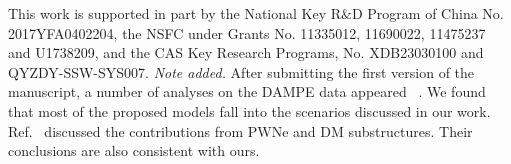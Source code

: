 \documentclass[aps,prl,twocolumn,a4paper]{revtex4}
\begin{document}



\begin{acknowledgments}
This work is supported in part by the National Key R$\&$D Program of China 
No. 2017YFA0402204, the NSFC under Grants No. 11335012, 11690022, 11475237 and U1738209,
and the CAS Key Research Programs, No. XDB23030100 and QYZDY-SSW-SYS007.
{\it Note added.} After submitting the first version of the manuscript,
a number of analyses on the DAMPE data appeared%
~\cite{
Yuan:2017ysv,Fan:2017sor,Fang:2017tvj,Duan:2017pkq,Gu:2017gle,
Athron:2017drj,Cao:2017ydw,Liu:2017rgs,Zu:2017dzm,Tang:2017lfb,
Chao:2017yjg,Gu:2017bdw,Duan:2017qwj,Cholis:2017ccs,Jin:2017qcv,
Gao:2017pym,Niu:2017hqe,Chao:2017emq,Chen:2017tva,Li:2017tmd,
Zhu:2017tvk,Gu:2017lir,Nomura:2017ohi,Ghorbani:2017cey,Cao:2017sju,
Yang:2017cjm,Ding:2017jdr,Liu:2017obm,Ge:2017tkd,Zhao:2017nrt,
Sui:2017qra,Okada:2017pgr,Cao:2017rjr,Dutta:2017sod,Fowlie:2017fya,Han:2017ars,
Niu:2017lts%
}.
We found that most of the proposed models fall into the scenarios 
discussed in our work.
Ref.~\cite{Yuan:2017ysv} discussed the contributions from PWNe and DM substructures.
Their conclusions are also consistent with ours.
\end{acknowledgments}






\clearpage
\onecolumngrid

\end{document}
